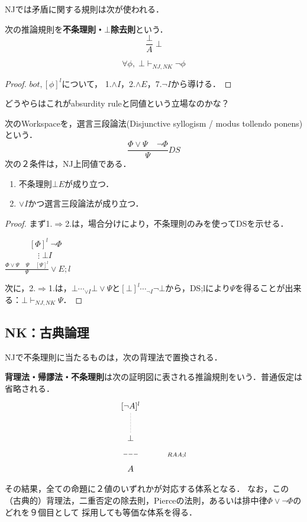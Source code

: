\documentclass[uplatex, dvipdfmx]{jsreport}
\begin{document}
NJでは矛盾に関する規則は次が使われる．
\begin{definition}
    次の推論規則を\textbf{不条理則・$\bot$除去則}という．
    \[ \frac{\bot}{A}\;\bot \]
\end{definition}

\begin{proposition}[ARよりも弱い命題なら常に成り立つ]
    \[\forall\phi,\;\bot\vdash_{NJ,NK}\lnot\phi\]
\end{proposition}
\begin{proof}$bot,[\phi]^l$について，
    1.$\land I$，2.$\land E$，7.$\lnot I$から導ける．
\end{proof}
\begin{remark}
    どうやら\cite{論理と計算のしくみ}はこれがabsurdity ruleと同値という立場なのかな？
\end{remark}

\begin{proposition}[ARの妥当性]
    次のWorkspaceを，選言三段論法(Disjunctive syllogism / modus tollendo ponens)という．
    \[\frac{\Phi\lor\Psi\;\;\;\;\lnot\Phi}{\Psi}DS\]
    次の２条件は，NJ上同値である．
    \begin{enumerate}
        \item 不条理則$\bot E$が成り立つ．
        \item $\lor I$かつ選言三段論法が成り立つ．
    \end{enumerate}
\end{proposition}
\begin{proof}
    まず1.$\Rightarrow$2.は，場合分けにより，不条理則のみを使ってDSを示せる．

    　　　$[\Phi]^l\;\lnot\Phi$\\
    　　　　$\vdots\;\bot I$\\
    $\frac{\Phi\lor\Psi\;\;\;\;\Psi\;\;\;\;[\Psi]^l}{\Psi}\lor E;l$
    
    次に，2.$\Rightarrow$1.は，$\bot\cdots_{\lor I}\bot\lor\Psi$と$[\bot]^l\cdots_{\lnot I}\lnot\bot$から，DS;lにより$\Psi$を得ることが出来る：$\bot\vdash_{NJ,NK}\Psi$．
\end{proof}

\subsection{NK：古典論理}

NJで不条理則に当たるものは，次の背理法で置換される．
\begin{definition}
    \textbf{背理法・帰謬法・不条理則}は次の証明図に表される推論規則をいう．普通仮定は省略される．
    \[
        \xymatrix{
            {[\lnot A]^l}\ar@{.}[d]\\{\bot}\ar@{}[d]|{---}&{}\ar@{}[d]^-{RAA;l}
            \\A&{}
        }
    \]
\end{definition}
その結果，全ての命題に２値のいずれかが対応する体系となる．
なお，この（古典的）背理法，二重否定の除去則，Pierceの法則，あるいは排中律$\Phi\lor\lnot\Phi$のどれを９個目として
採用しても等価な体系を得る．
\end{document}
